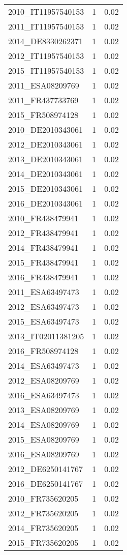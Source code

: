 \begin{table*}[htbp]
\begin{tabular}{lrr}
2010_IT11957540153 & 1 & 0.02 \\
2011_IT11957540153 & 1 & 0.02 \\
2014_DE8330262371 & 1 & 0.02 \\
2012_IT11957540153 & 1 & 0.02 \\
2015_IT11957540153 & 1 & 0.02 \\
2011_ESA08209769 & 1 & 0.02 \\
2011_FR437733769 & 1 & 0.02 \\
2015_FR508974128 & 1 & 0.02 \\
2010_DE2010343061 & 1 & 0.02 \\
2012_DE2010343061 & 1 & 0.02 \\
2013_DE2010343061 & 1 & 0.02 \\
2014_DE2010343061 & 1 & 0.02 \\
2015_DE2010343061 & 1 & 0.02 \\
2016_DE2010343061 & 1 & 0.02 \\
2010_FR438479941 & 1 & 0.02 \\
2012_FR438479941 & 1 & 0.02 \\
2014_FR438479941 & 1 & 0.02 \\
2015_FR438479941 & 1 & 0.02 \\
2016_FR438479941 & 1 & 0.02 \\
2011_ESA63497473 & 1 & 0.02 \\
2012_ESA63497473 & 1 & 0.02 \\
2015_ESA63497473 & 1 & 0.02 \\
2013_IT02011381205 & 1 & 0.02 \\
2016_FR508974128 & 1 & 0.02 \\
2014_ESA63497473 & 1 & 0.02 \\
2012_ESA08209769 & 1 & 0.02 \\
2016_ESA63497473 & 1 & 0.02 \\
2013_ESA08209769 & 1 & 0.02 \\
2014_ESA08209769 & 1 & 0.02 \\
2015_ESA08209769 & 1 & 0.02 \\
2016_ESA08209769 & 1 & 0.02 \\
2012_DE6250141767 & 1 & 0.02 \\
2016_DE6250141767 & 1 & 0.02 \\
2010_FR735620205 & 1 & 0.02 \\
2012_FR735620205 & 1 & 0.02 \\
2014_FR735620205 & 1 & 0.02 \\
2015_FR735620205 & 1 & 0.02 \\

\end{tabular}
\end{table*}
